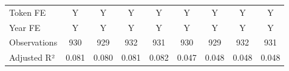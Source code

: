 {\begin{tabular}{l*{8}{c}}
\midrule
Token FE            &           Y         &           Y         &           Y         &           Y         &           Y         &           Y         &           Y         &           Y         \\
Year FE             &           Y         &           Y         &           Y         &           Y         &           Y         &           Y         &           Y         &           Y         \\
Observations        &         930         &         929         &         932         &         931         &         930         &         929         &         932         &         931         \\
Adjusted R²         &       0.081         &       0.080         &       0.081         &       0.082         &       0.047         &       0.048         &       0.048         &       0.048         \\
\bottomrule
\end{tabular}
}
